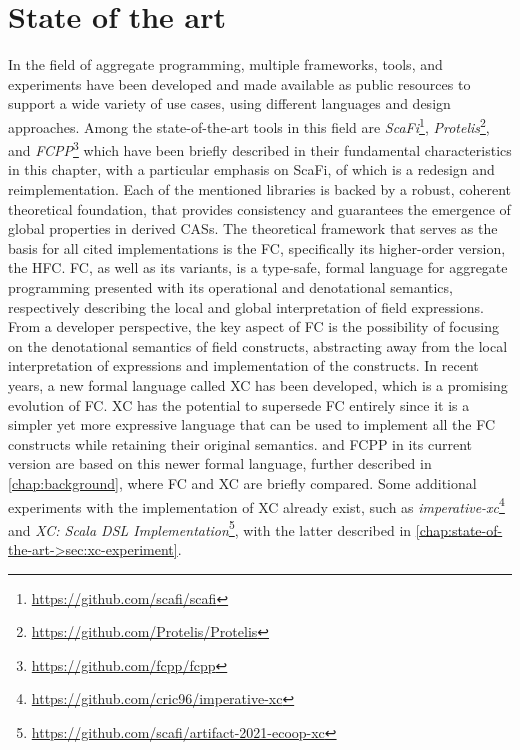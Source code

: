\chapter{State of the art}
\label{chap:state-of-the-art}

In the field of aggregate programming\cite{aggregate-programming}, multiple frameworks, tools, and experiments have been developed and made available as public resources to support a wide variety of use cases, using different languages and design approaches.
%
Among the state-of-the-art tools in this field are \textit{ScaFi}\footnote{\url{https://github.com/scafi/scafi}}\cite{scafi}, \textit{Protelis}\footnote{\url{https://github.com/Protelis/Protelis}}\cite{protelis}, and \textit{FCPP}\footnote{\url{https://github.com/fcpp/fcpp}}\cite{fcpp} which have been briefly described in their fundamental characteristics in this chapter, with a particular emphasis on ScaFi, of which \this is a redesign and reimplementation.
%
Each of the mentioned libraries is backed by a robust, coherent theoretical foundation, that provides consistency and guarantees the emergence of global properties in derived \acp{CAS}.
%
The theoretical framework that serves as the basis for all cited implementations is the \ac{FC}\cite{fc}, specifically its higher-order version, the \ac{HFC}\cite{hofc}.
%
\ac{FC}, as well as its variants, is a type-safe, formal language for aggregate programming\cite{fc, from-dc-to-fc-and-ap} presented with its operational and denotational semantics, respectively describing the local and global interpretation of field expressions\cite{from-dc-to-fc-and-ap}.
%
From a developer perspective, the key aspect of \ac{FC} is the possibility of focusing on the denotational semantics of field constructs, abstracting away from the local interpretation of expressions and implementation of the constructs.
%
In recent years, a new formal language called \ac{XC}\cite{xc} has been developed, which is a promising evolution of \ac{FC}.
%
\ac{XC}\cite{xc} has the potential to supersede \ac{FC} entirely since it is a simpler yet more expressive language that can be used to implement all the \ac{FC} constructs while retaining their original semantics.
%
\this and FCPP in its current version are based on this newer formal language, further described in \cref{chap:background}, where \ac{FC} and \ac{XC} are briefly compared.
%
Some additional experiments with the implementation of \ac{XC} already exist, such as \textit{imperative-xc}\footnote{\url{https://github.com/cric96/imperative-xc}} and \textit{XC: Scala DSL Implementation}\footnote{\url{https://github.com/scafi/artifact-2021-ecoop-xc}}\cite{xc-experiment-with-scafi}, with the latter described in \cref{chap:state-of-the-art->sec:xc-experiment}.

